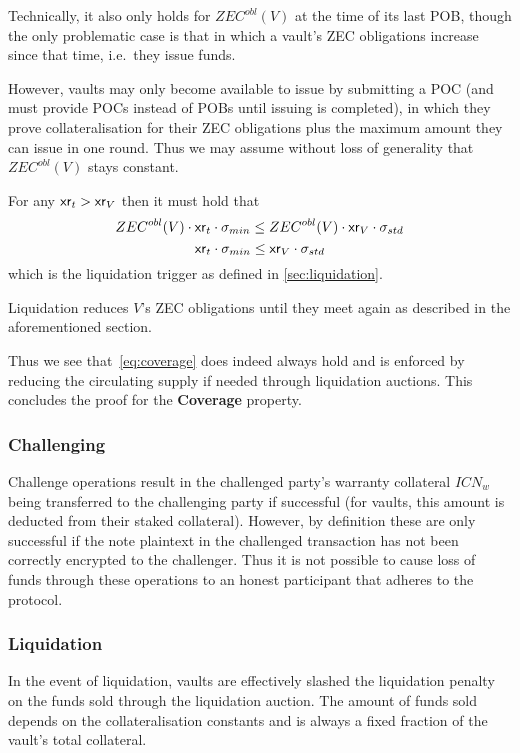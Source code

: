 Technically, it also only holds for $ZEC^{obl}(V)$ at the time of its last POB, though the only problematic case is that in which a vault's ZEC obligations increase since that time, i.e.\ they issue funds.

However, vaults may only become available to issue by submitting a POC (and must provide POCs instead of POBs until issuing is completed), in which they prove collateralisation for their ZEC obligations plus the maximum amount they can issue in one round.
Thus we may assume without loss of generality that $ZEC^{obl}(V)$ stays constant.

For any $\mathsf{xr}_t > \mathsf{xr}_V$ then it must hold that
\[
    ZEC^{obl}(V) \cdot \mathsf{xr}_t \cdot \sigma_{min} \leq ZEC^{obl}(V) \cdot \mathsf{xr}_V \cdot \sigma_{std}
\]
\[
    \mathsf{xr}_t \cdot \sigma_{min} \leq \mathsf{xr}_V \cdot \sigma_{std}
\]
which is the liquidation trigger as defined in \cref{sec:liquidation}.

Liquidation reduces $V$'s ZEC obligations until they meet \sstd again as described in the aforementioned section.

Thus we see that~\eqref{eq:coverage} does indeed always hold and is enforced by reducing the circulating supply if needed through liquidation auctions.
This concludes the proof for the \textbf{Coverage} property.

\subsubsection{Challenging}

Challenge operations result in the challenged party's warranty collateral $ICN_w$ being transferred to the challenging party if successful (for vaults, this amount is deducted from their staked collateral).
However, by definition these are only successful if the note plaintext in the challenged transaction has not been correctly encrypted to the challenger.
Thus it is not possible to cause loss of funds through these operations to an honest participant that adheres to the protocol.

\subsubsection{Liquidation}
\label{sec:analysis_liquidation}

In the event of liquidation, vaults are effectively slashed the liquidation penalty on the funds sold through the liquidation auction.
The amount of funds sold depends on the collateralisation constants and is always a fixed fraction of the vault's total collateral.

